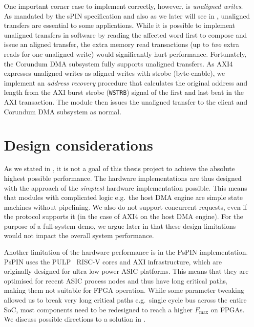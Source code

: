 One important corner case to implement correctly, however, is \emph{unaligned writes}.  As mandated by the sPIN specification and also as we later will see in , unaligned transfers are essential to some applications.  While it is possible to implement unaligned transfers in software by reading the affected word first to compose and issue an aligned transfer, the extra memory read transactions (up to \emph{two} extra reads for one unaligned write) would significantly hurt performance.  Fortunately, the Corundum DMA subsystem fully supports unaligned transfers.  As AXI4 expresses unaligned writes as aligned writes with strobe (byte-enable), we implement an \emph{address recovery} procedure that calculates the original address and length from the AXI burst strobe (\texttt{WSTRB}) signal of the first and last beat in the AXI transaction.  The module then issues the unaligned transfer to the client and Corundum DMA subsystem as normal.

\section{Design considerations} \label{sec:hw-design-considerations}

As we stated in , it is not a goal of this thesis project to achieve the absolute highest possible performance.  The hardware implementations are thus designed with the approach of the \emph{simplest} hardware implementation possible.  This means that modules with complicated logic e.g.\ the host DMA engine are simple state machines without pipelining.  We also do not support concurrent requests, even if the protocol supports it (in the case of AXI4 on the host DMA engine).  For the purpose of a full-system demo, we argue later in  that these design limitations would not impact the overall system performance.

Another limitation of the hardware performance is in the PsPIN implementation.  PsPIN uses the PULP~\cite{rossi_pulp_2015} RISC-V cores and AXI infrastructure, which are originally designed for ultra-low-power ASIC platforms.  This means that they are optimised for recent ASIC process nodes and thus have long critical paths, making them not suitable for FPGA operation.  While some parameter tweaking allowed us to break very long critical paths e.g.\ single cycle bus across the entire SoC, most components need to be redesigned to reach a higher $F_{\text{max}}$ on FPGAs.  We discuss possible directions to a solution in .

